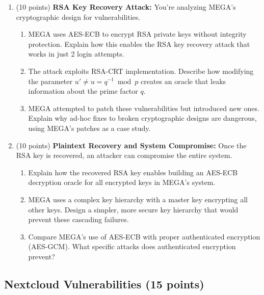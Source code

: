 \documentclass[10pt,a4paper,american]{exam}
\begin{document}
\begin{enumerate}
	\item (10 points) \textbf{RSA Key Recovery Attack:}
	      You're analyzing MEGA's cryptographic design for vulnerabilities.
	      \begin{enumerate}
		      \item MEGA uses AES-ECB to encrypt RSA private keys without integrity protection. Explain how this enables the RSA key recovery attack that works in just 2 login attempts.
		      \item The attack exploits RSA-CRT implementation. Describe how modifying the parameter $u' \neq u = q^{-1} \bmod p$ creates an oracle that leaks information about the prime factor $q$.
		      \item MEGA attempted to patch these vulnerabilities but introduced new ones. Explain why ad-hoc fixes to broken cryptographic designs are dangerous, using MEGA's patches as a case study.
	      \end{enumerate}
	\item (10 points) \textbf{Plaintext Recovery and System Compromise:}
	      Once the RSA key is recovered, an attacker can compromise the entire system.
	      \begin{enumerate}
		      \item Explain how the recovered RSA key enables building an AES-ECB decryption oracle for all encrypted keys in MEGA's system.
		      \item MEGA uses a complex key hierarchy with a master key encrypting all other keys. Design a simpler, more secure key hierarchy that would prevent these cascading failures.
		      \item Compare MEGA's use of AES-ECB with proper authenticated encryption (AES-GCM). What specific attacks does authenticated encryption prevent?
	      \end{enumerate}
\end{enumerate}

\subsection{Nextcloud Vulnerabilities (15 points)}
\end{document}
